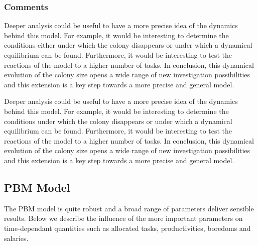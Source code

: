 \subsubsection{Comments}

Deeper analysis could be useful to have a more precise idea of the
dynamics behind this model. For example, it would be interesting to
determine the conditions either under which the colony disappears or under
which a dynamical equilibrium can be found. Furthermore, it would
be interesting to test the reactions of the model to a higher number
of tasks. In conclusion, this dynamical evolution of the colony size
opens a wide range of new investigation possibilities and this extension
is a key step towards a more precise and general model.


Deeper analysis could be useful to have a more precise idea of the
dynamics behind this model. For example, it would be interesting to
determine the conditions under which the colony disappears or under
which a dynamical equilibrium can be found. Furthermore, it would
be interesting to test the reactions of the model to a higher number
of tasks. In conclusion, this dynamical evolution of the colony size
opens a wide range of new investigation possibilities and this extension
is a key step towards a more precise and general model.
%

 

\subsection{PBM Model}
The PBM model is quite robust and a broad range of parameters deliver sensible results. Below we describe the influence of the more important parameters on time-dependant quantities such as allocated tasks, productivities, boredoms and salaries. 

